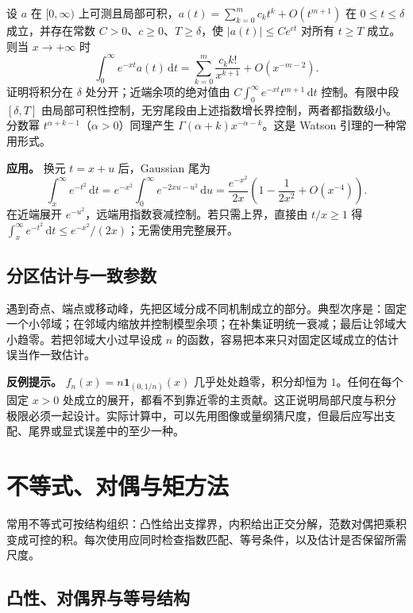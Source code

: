 \documentclass[UTF8,12pt,a4paper,fontset=fandol]{ctexart}
\begin{document}
\label{app:estimate-watson}

设 $a$ 在 $[0,\infty)$ 上可测且局部可积，$a(t)=\sum_{k=0}^mc_kt^k+O(t^{m+1})$ 在 $0\leq t\leq\delta$ 成立，并存在常数 $C>0$、$c\geq0$、$T\geq\delta$，使 $|a(t)|\leq Ce^{ct}$ 对所有 $t\geq T$ 成立。则当 $x\to+\infty$ 时
\[
\int_0^\infty e^{-xt}a(t)\,\mathrm dt
=\sum_{k=0}^m\frac{c_kk!}{x^{k+1}}+O(x^{-m-2}).
\]
证明将积分在 $\delta$ 处分开；近端余项的绝对值由 $C\int_0^\infty e^{-xt}t^{m+1}\,\mathrm dt$ 控制。有限中段 $[\delta,T]$ 由局部可积性控制，无穷尾段由上述指数增长界控制，两者都指数级小。分数幂 $t^{\alpha+k-1}$（$\alpha>0$）同理产生 $\Gamma(\alpha+k)x^{-\alpha-k}$。这是 Watson 引理的一种常用形式。

\textbf{应用。} 换元 $t=x+u$ 后，Gaussian 尾为
\[
\int_x^\infty e^{-t^2}\,\mathrm dt
=e^{-x^2}\int_0^\infty e^{-2xu-u^2}\,\mathrm du
=\frac{e^{-x^2}}{2x}\left(1-\frac1{2x^2}+O(x^{-4})\right).
\]
在近端展开 $e^{-u^2}$，远端用指数衰减控制。若只需上界，直接由 $t/x\geq1$ 得 $\int_x^\infty e^{-t^2}\,\mathrm dt\leq e^{-x^2}/(2x)$；无需使用完整展开。

\subsection{分区估计与一致参数}

\label{app:estimate-split}

遇到奇点、端点或移动峰，先把区域分成不同机制成立的部分。典型次序是：固定一个小邻域；在邻域内缩放并控制模型余项；在补集证明统一衰减；最后让邻域大小趋零。若把邻域大小过早设成 $n$ 的函数，容易把本来只对固定区域成立的估计误当作一致估计。

\textbf{反例提示。} $f_n(x)=n\mathbf1_{(0,1/n)}(x)$ 几乎处处趋零，积分却恒为 $1$。任何在每个固定 $x>0$ 处成立的展开，都看不到靠近零的主贡献。这正说明局部尺度与积分极限必须一起设计。实际计算中，可以先用图像或量纲猜尺度，但最后应写出支配、尾界或显式误差中的至少一种。



\section{不等式、对偶与矩方法}

常用不等式可按结构组织：凸性给出支撑界，内积给出正交分解，范数对偶把乘积变成可控的积。每次使用应同时检查指数匹配、等号条件，以及估计是否保留所需尺度。

\subsection{凸性、对偶界与等号结构}
\end{document}
